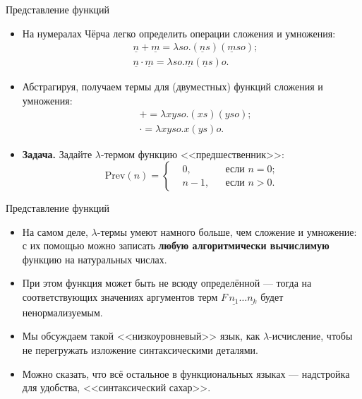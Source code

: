 \documentclass[xcolor=dvipsnames]{beamer}
\begin{document}
\begin{frame}{Представление функций}

\begin{itemize}
 \item На нумералах Чёрча легко определить операции сложения и умножения:
 \begin{align*}
 & \underline{n} + \underline{m} = 
 \lambda s o. (\underline{n} s)(\underline{m} s o);
 \\
 & \underline{n} \cdot \underline{m} = 
 \lambda s o. \underline{m}(\underline{n} s) o. 
 \end{align*}

 \item Абстрагируя, получаем термы для (двуместных) функций сложения и умножения:
 \begin{align*}
  & \boldsymbol{+} = \lambda xyso. (xs)(yso);\\
  & \boldsymbol{\cdot} = \lambda xyso. x(ys)o.
 \end{align*}

 \item {\bf Задача.} Задайте $\lambda$-термом функцию <<предшественник>>:
 \[
  \mathrm{Prev}(n) = \left\{
  \begin{aligned}
   & 0, && \mbox{если $n = 0$;}\\
   & n-1, && \mbox{если $n > 0$.}
  \end{aligned} \right.
 \]

\end{itemize}

 
 
\end{frame}

\begin{frame}{Представление функций}
 
 \begin{itemize}[<+->]
  \item На самом деле, $\lambda$-термы умеют намного больше, чем сложение и умножение: с их помощью можно записать {\bf любую алгоритмически вычислимую} функцию на натуральных числах.
  \item При этом функция может быть не всюду определённой --- тогда на соответствующих значениях аргументов терм $F\, \underline{n_1} \ldots \underline{n_k}$ будет ненормализуемым.
  \item Мы обсуждаем такой <<низкоуровневый>> язык, как $\lambda$-исчисление, чтобы не перегружать изложение синтаксическими деталями.
  \item Можно сказать, что всё остальное в функциональных языках --- надстройка для удобства, <<синтаксический сахар>>.
 \end{itemize}

\end{frame}
\end{document}
